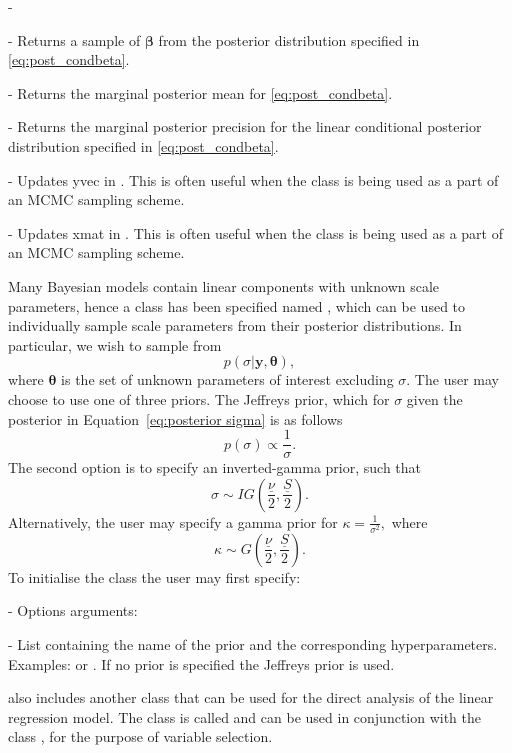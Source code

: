 -\documentclass[article]{jss}
\begin{document}
\begin{description}

\item {} - Returns a sample of $\bm{\beta}$ from the
  posterior distribution specified in \ref{eq:post_condbeta}.
\item {} - Returns the marginal
  posterior mean for \ref{eq:post_condbeta}.
\item {} - Returns the
  marginal posterior precision for the linear conditional posterior
  distribution specified in \ref{eq:post_condbeta}.
\item {} - Updates yvec in
  . This is often useful when the class is
  being used as a part of an MCMC sampling scheme.
\item {} - Updates xmat in
  . This is often useful when the class is
  being used as a part of an MCMC sampling scheme.
\end{description}
Many Bayesian models contain linear components with unknown scale
parameters, hence a class has been specified named
, which can be used to individually sample
scale parameters from their posterior distributions. In particular, we
wish to sample from
\begin{equation} p(\sigma|\bm{y},\bm{\theta}),\label{eq:posterior
    sigma}
\end{equation} where $\bm{\theta}$ is the set of unknown
parameters of interest excluding $\sigma.$ The user may choose to use
one of three priors.  The Jeffreys prior, which for $\sigma$ given
the posterior in Equation~\ref{eq:posterior sigma} is as follows \[
p(\sigma)\propto\frac{1}{\sigma}.\] The second option is to specify an
inverted-gamma prior, such that\[ \sigma\sim
IG\left(\frac{\underline{\nu}}{2},\frac{\underline{S}}{2}\right).\]
Alternatively, the user may specify a gamma prior for
$\kappa=\frac{1}{\sigma^{2}},$ where\[ \kappa\sim
G\left(\frac{\underline{\nu}}{2},\frac{\underline{S}}{2}\right).\] To
initialise the class  the user may first
specify:
\begin{description}
\item {} - Options arguments:
\begin{description}
\item {} - List containing the name of the prior and the
  corresponding hyperparameters. Examples: \newline
   or \newline
  . If no prior is
  specified the Jeffreys prior is used.
\end{description}
\end{description}
 also includes another class that can be used for the
direct analysis of the linear regression model. The class is called
 and can be used in conjunction with the class
, for the purpose of variable selection.
\end{document}
